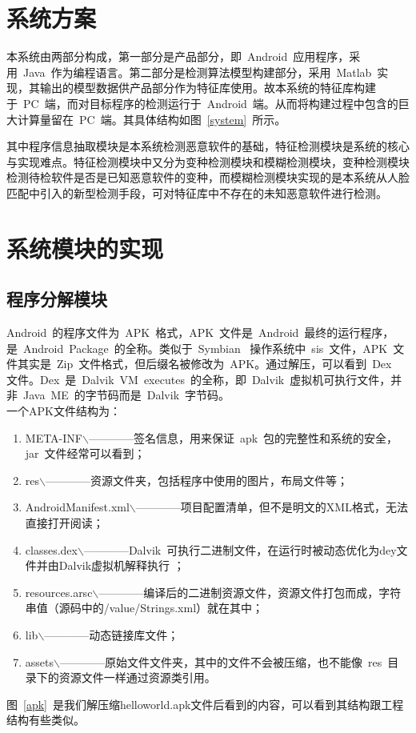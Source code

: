 \section{系统方案}
	 本系统由两部分构成，第一部分是产品部分，即~Android~应用程序，采用~Java~作为编程语言。第二部分是检测算法模型构建部分，采用~Matlab~实现，其输出的模型数据供产品部分作为特征库使用。故本系统的特征库构建于~PC~端，而对目标程序的检测运行于~Android~端。从而将构建过程中包含的巨大计算量留在~PC~端。其具体结构如图~\ref{system}~所示。

	 其中程序信息抽取模块是本系统检测恶意软件的基础，特征检测模块是系统的核心与实现难点。特征检测模块中又分为变种检测模块和模糊检测模块，变种检测模块检测待检软件是否是已知恶意软件的变种，而模糊检测模块实现的是本系统从人脸匹配中引入的新型检测手段，可对特征库中不存在的未知恶意软件进行检测。

\section{系统模块的实现}
	\subsection{程序分解模块}

		 Android~的程序文件为~APK~格式，APK~文件是~Android~最终的运行程序，是~Android~Package~的全称。类似于~Symbian~ 操作系统中~sis~文件，APK~文件其实是~Zip~文件格式，但后缀名被修改为~APK。通过解压，可以看到~Dex~ 文件。Dex~是~Dalvik~VM~executes~的全称，即~Dalvik~虚拟机可执行文件，并非~Java~ME~的字节码而是~Dalvik~字节码。\\
		一个APK文件结构为：
		\begin{enumerate}
		\item META-INF$\backslash$————签名信息，用来保证~apk~包的完整性和系统的安全，jar~文件经常可以看到；
		\item res$\backslash$————资源文件夹，包括程序中使用的图片，布局文件等；
		\item AndroidManifest.xml$\backslash$————项目配置清单，但不是明文的XML格式，无法直接打开阅读；
		\item classes.dex$\backslash$————Dalvik~可执行二进制文件，在运行时被动态优化为dey文件并由Dalvik虚拟机解释执行	 ；
		\item resources.arsc$\backslash$————编译后的二进制资源文件，资源文件打包而成，字符串值（源码中的/value/Strings.xml）就在其中；
		\item lib$\backslash$————动态链接库文件；
		\item assets$\backslash$————原始文件文件夹，其中的文件不会被压缩，也不能像~res~目录下的资源文件一样通过资源类引用。
		\end{enumerate}\par
		 图~\ref{apk}~是我们解压缩helloworld.apk文件后看到的内容，可以看到其结构跟工程结构有些类似。

